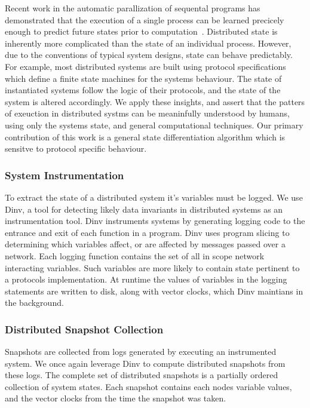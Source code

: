  Recent work in the automatic parallization of sequental programs has
 demonstrated that the execution of a single process can be learned
 precicely enough to predict future states prior to
 computation~\cite{103}. Distributed state is inherently more
 complicated than the state of an individual process. However, due to
 the conventions of typical system designs, state can behave
 predictably.  For example, most distributed systems are built using
 protocol specifications which define a finite state machines for the
 systems behaviour. The state of instantiated systems follow the logic
 of their protocols, and the state of the system is altered
 accordingly. We apply these insights, and assert that the patters of
 exeuction in distributed systms can be meaninfully understood by
 humans, using only the systems state, and general computational
 techniques. Our primary contribution of this work is a general state
 differentiation algorithm which is sensitve to protocol specific
 behaviour.

\subsubsection{System Instrumentation}

To extract the state of a distributed system it's variables must be
logged. We use Dinv, a tool for detecting likely data invariants in
distributed systems as an instrumentation tool. Dinv instruments
systems by generating logging code to the entrance and exit of each
function in a program. Dinv uses program slicing to determining which
variables affect, or are affected by messages passed over a network.
Each logging function contains the set of all in scope network
interacting variables. Such variables are more likely to contain state
pertinent to a protocols implementation. At runtime the values of
variables in the logging statements are written to disk, along with
vector clocks, which Dinv maintians in the background.

\subsubsection{Distributed Snapshot Collection}

Snapshots are collected from logs generated by executing an
instrumented system. We once again leverage Dinv to compute
distributed snapshots from these logs. The complete set of distributed
snapshots is a partially ordered collection of system states.  Each
snapshot contains each nodes variable values, and the vector clocks
from the time the snapshot was taken.

